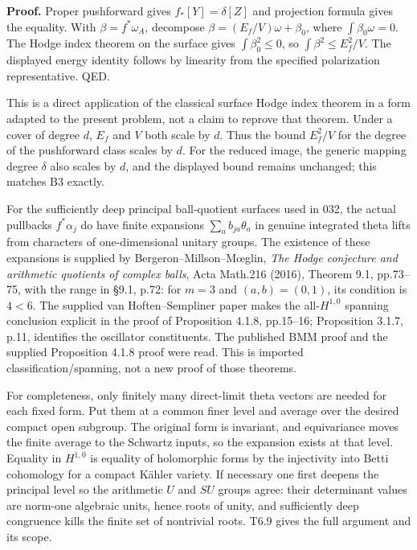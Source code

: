 \documentclass[11pt,a4paper]{article}
\theoremstyle{definition}
\begin{document}
\textbf{Proof.} Proper pushforward gives \(f_*[Y]=\delta[Z]\) and
projection formula gives the equality. With \(\beta=f^*\omega_A\),
decompose \(\beta=(E_f/V)\omega+\beta_0\), where
\(\int\beta_0\omega=0\). The Hodge index theorem on the surface gives
\(\int\beta_0^2\leq0\), so \(\int\beta^2\leq E_f^2/V\). The displayed
energy identity follows by linearity from the specified polarization
representative. QED.

This is a direct application of the classical surface Hodge index
theorem in a form adapted to the present problem, not a claim to reprove
that theorem. Under a cover of degree \(d\), \(E_f\) and \(V\) both
scale by \(d\). Thus the bound \(E_f^2/V\) for the degree of the
pushforward class scales by \(d\). For the reduced image, the generic
mapping degree \(\delta\) also scales by \(d\), and the displayed bound
remains unchanged; this matches B3 exactly.

For the sufficiently deep principal ball-quotient surfaces used in 032,
the actual pullbacks \(f^*\alpha_j\) do have finite expansions
\(\sum_a b_{ja}\theta_a\) in genuine integrated theta lifts from
characters of one-dimensional unitary groups. The existence of these
expansions is supplied by Bergeron--Millson--Mœglin, \emph{The Hodge
conjecture and arithmetic quotients of complex balls}, Acta Math.216
(2016), Theorem 9.1, pp.73--75, with the range in §9.1, p.72: for
\(m=3\) and \((a,b)=(0,1)\), its condition is \(4<6\). The supplied van
Hoften--Sempliner paper makes the all-\(H^{1,0}\) spanning conclusion
explicit in the proof of Proposition 4.1.8, pp.15--16; Proposition
3.1.7, p.11, identifies the oscillator constituents. The published BMM
proof and the supplied Proposition 4.1.8 proof were read. This is
imported classification/spanning, not a new proof of those theorems.

For completeness, only finitely many direct-limit theta vectors are
needed for each fixed form. Put them at a common finer level and average
over the desired compact open subgroup. The original form is invariant,
and equivariance moves the finite average to the Schwartz inputs, so the
expansion exists at that level. Equality in \(H^{1,0}\) is equality of
holomorphic forms by the injectivity into Betti cohomology for a compact
Kähler variety. If necessary one first deepens the principal level so
the arithmetic \(U\) and \(SU\) groups agree: their determinant values
are norm-one algebraic units, hence roots of unity, and sufficiently
deep congruence kills the finite set of nontrivial roots. T6.9 gives the
full argument and its scope.
\end{document}
